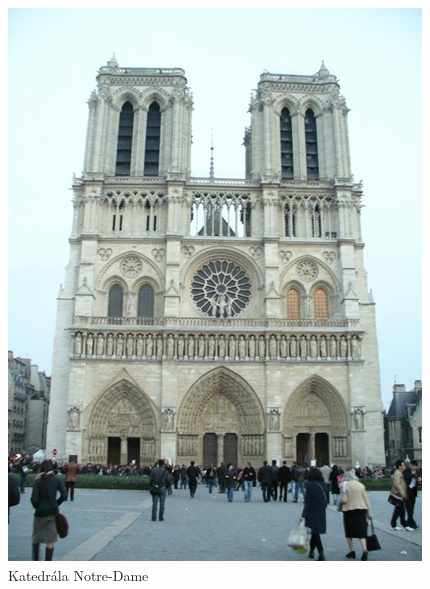\begin{figure}[h!]
\centering
\includegraphics[scale=0.5]{images/obr6N.jpg}
\caption{Katedrála Notre-Dame}


\end{figure}
